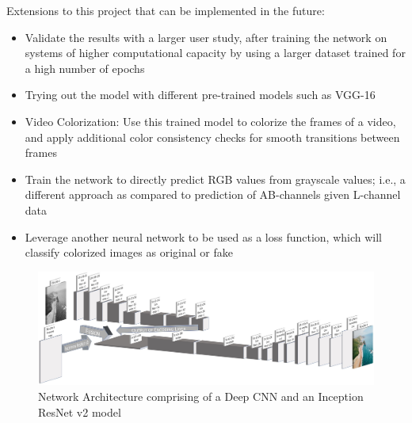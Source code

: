\documentclass[10pt,twocolumn,letterpaper]{article}
\begin{document}
	Extensions to this project that can be implemented in the future:
	\begin{itemize}
		\item Validate the results with a larger user study, after training the network on systems of higher computational capacity by using a larger dataset trained for a high number of epochs
		\item Trying out the model with different pre-trained models such as VGG-16
		\item Video Colorization: Use this trained model to colorize the frames of a video, and apply additional color consistency checks for smooth transitions between frames
		\item Train the network to directly predict RGB values from grayscale values; i.e., a different approach as compared to prediction of AB-channels given L-channel data
		\item Leverage another neural network to be used as a loss function, which will classify colorized images as original or fake
	\end{itemize}

	\begin{figure}
		\includegraphics[width=\textwidth]{Architecture}
		\caption{Network Architecture comprising of a Deep CNN and an Inception ResNet v2 model}
	\end{figure}
\end{document}
